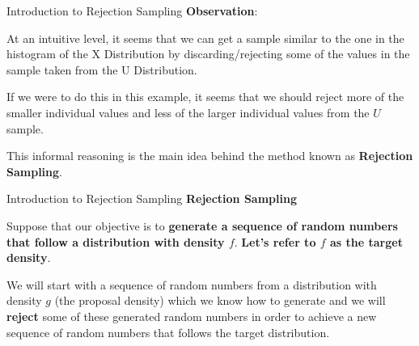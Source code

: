 \documentclass[8pt]{beamer}
\begin{document}
\begin{frame}{Introduction to Rejection Sampling}
\textbf{Observation}:

\vspace{2mm}

At an intuitive level, it seems that we can get a sample similar to the one in the histogram of the X Distribution by discarding/rejecting some of the values in the sample taken from the U Distribution.  

\vspace{2mm}

If we were to do this in this example, it seems that we should reject more of the smaller individual values and less of the larger individual values from the $U$ sample.

\vspace{2mm}

This informal reasoning is the main idea behind the method known as \textbf{Rejection Sampling}. 
\end{frame}


\begin{frame}{Introduction to Rejection Sampling}
\textbf{Rejection Sampling}

\vspace{2mm}

Suppose that our objective is to \textbf{generate a sequence of random numbers that follow a distribution with density $f$}. \textbf{Let's refer to $f$ as the target density}.

\vspace{2mm}

We will start with a sequence of random numbers from a distribution with density $g$ (the proposal density) which we know how to generate and we will \textbf{reject} some of these generated random numbers in order to achieve a new sequence of random numbers that follows the target distribution.
\end{frame}
\end{document}

